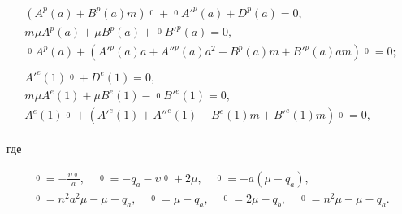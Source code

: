 \begin{gather} 

\label{eq:gotbuntov_31} 

\begin{array}{c} 

(A^p(a)+B^p(a)m)\mathop{\phi_1}\limits^{0}+\mathop{\phi_2}\limits^{0}A'^p(a)+D^{p}(a)=0, 

\\ 

m\mu A^p(a)+\mu B^p(a)+\mathop{\phi_3}\limits^{0} B'^p(a)=0, 

\\ 

\mathop{\phi_4}\limits^{0} A^p(a)+(A'^p(a)a+A''^p(a)a^2-B^p(a)m+B'^p(a)am)\mathop{\phi_5}\limits^{0}=0; 

\end{array} 

\\

\label{eq:gotbuntov_32} 

\begin{array}{c} 

A'^e(1)\mathop{\phi_6}\limits^{0}+D^e(1)=0,

\\ 

m\mu A^e(1)+\mu B^e(1)-\mathop{\phi_5}\limits^{0} B'^e(1)=0,

\\

A^e(1)\mathop{\phi_7}\limits^{0}+(A'^e(1)+A''^e(1)-B^e(1)m+B'^e(1)m)\mathop{\phi_5}\limits^{0}=0,

\end{array} 

\end{gather} 

где

\begin{gather*}

\mathop{\phi_1}\limits^{0}=-\frac{\upsilon  \mathop{\psi_3}\limits^{0}}{a},\quad 

\mathop{\phi_2}\limits^{0}=-q_a-\upsilon  \mathop{\psi_1}\limits^{0}+2\mu,\quad  

\mathop{\phi_3}\limits^{0}=-a(\mu-q_a), \\ 

\mathop{\phi_4}\limits^{0}=n^2a^2\mu-\mu-q_a, \quad 

\mathop{\phi_5}\limits^{0}=\mu-q_a, \quad  

\mathop{\phi_6}\limits^{0}=2\mu-q_b,\quad  

\mathop{\phi_7}\limits^{0}=n^2\mu-\mu-q_a.

\end{gather*}



